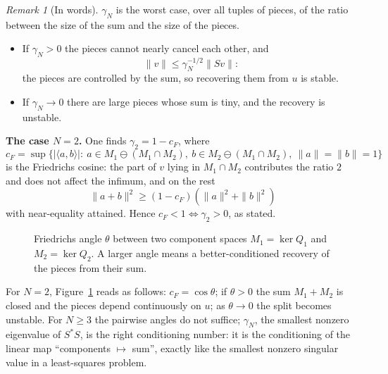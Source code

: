 \documentclass[11pt]{article}
\theoremstyle{plain}
\theoremstyle{definition}
\theoremstyle{remark}
\newtheorem{remark}[theorem]{Remark}
\newenvironment{aside}[1]{\begin{remark}[#1]}{\end{remark}}
\begin{document}
\begin{aside}{In words}
$\gamma_N$ is the worst case, over all tuples of pieces, of the ratio between the size of the sum and the size of the pieces.
\begin{itemize}[nosep]
\item If $\gamma_N>0$ the pieces cannot nearly cancel each other, and
\[
\|v\|\le\gamma_N^{-1/2}\|Sv\|:
\]
the pieces are controlled by the sum, so recovering them from $u$ is stable.
\item If $\gamma_N\to0$ there are large pieces whose sum is tiny, and the recovery is unstable.
\end{itemize}
\textbf{The case $N=2$.} One finds $\gamma_2=1-c_F$, where
\[
c_F=\sup\{|\langle a,b\rangle|:\ a\in M_1\ominus(M_1\cap M_2),\ b\in M_2\ominus(M_1\cap M_2),\ \|a\|=\|b\|=1\}
\]
is the Friedrichs cosine: the part of $v$ lying in $M_1\cap M_2$ contributes the ratio $2$ and does not affect the infimum, and on the rest
\[
\|a+b\|^2\ge(1-c_F)(\|a\|^2+\|b\|^2)
\]
with near-equality attained. Hence $c_F<1\iff\gamma_2>0$, as stated.
\end{aside}
\begin{figure}[!htb]
\centering
{}
\caption{Friedrichs angle $\theta$ between two component spaces $M_1=\ker Q_1$ and $M_2=\ker Q_2$. A larger angle means a better-conditioned recovery of the pieces from their sum.}\label{xfig:friedrichs}
\end{figure}
For $N=2$, Figure~\ref{xfig:friedrichs} reads as follows: $c_F=\cos\theta$; if $\theta>0$ the sum $M_1+M_2$ is closed and the pieces depend continuously on $u$; as $\theta\to0$ the split becomes unstable. For $N\ge3$ the pairwise angles do not suffice; $\gamma_N$, the smallest nonzero eigenvalue of $S^*S$, is the right conditioning number: it is the conditioning of the linear map ``components $\mapsto$ sum'', exactly like the smallest nonzero singular value in a least-squares problem.
\end{document}
